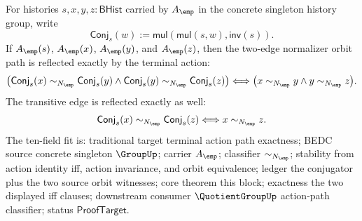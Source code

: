 \begin{theorem}
\label{thm:group-singleton-normalizer-orbit-action-path-iff}
For histories $s,x,y,z:\mathsf{BHist}$ carried by $A_{\emp}$ in the concrete
singleton history group, write
$$
\mathsf{Conj}_s(w):=\mathsf{mul}(\mathsf{mul}(s,w),\mathsf{inv}(s)).
$$
If $A_{\emp}(s)$, $A_{\emp}(x)$, $A_{\emp}(y)$, and $A_{\emp}(z)$, then the
two-edge normalizer orbit path is reflected exactly by the terminal action:
$$
\bigl(\mathsf{Conj}_s(x)\sim_{N_{\emp}}\mathsf{Conj}_s(y)
\land
\mathsf{Conj}_s(y)\sim_{N_{\emp}}\mathsf{Conj}_s(z)\bigr)
\Longleftrightarrow
\bigl(x\sim_{N_{\emp}}y\land y\sim_{N_{\emp}}z\bigr).
$$
The transitive edge is reflected exactly as well:
$$
\mathsf{Conj}_s(x)\sim_{N_{\emp}}\mathsf{Conj}_s(z)
\Longleftrightarrow
x\sim_{N_{\emp}}z.
$$
The ten-field fit is: traditional target terminal action path exactness; BEDC
source concrete singleton $\GroupUp$; carrier $A_{\emp}$; classifier
$\sim_{N_{\emp}}$; stability from action identity iff, action invariance, and
orbit equivalence; ledger the conjugator plus the two source orbit witnesses;
core theorem this block; exactness the two displayed iff clauses; downstream
consumer $\QuotientGroupUp$ action-path classifier; status
$\mathsf{ProofTarget}$.
\end{theorem}
